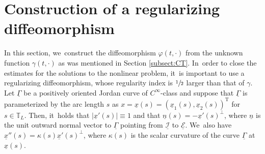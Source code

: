 \documentclass[10pt]{amsart}
\newcommand{\cI}{{\mathcal I}}
\newcommand{\cE}{{\mathcal E}}
\newcommand{\ul}[1]{\underline{#1}}
\newcommand{\itGamma}{\mathit{\Gamma}}
\theoremstyle{definition}
\begin{document}
\section{Construction of a regularizing diffeomorphism}\label{sect:diffeo}
In this section, we~construct the diffeomorphism $\varphi(t,\cdot)$ from the unknown function $\gamma(t,\cdot)$ as was mentioned in Section \ref{subsect:CT}. In~order to close the estimates for the solutions to the nonlinear problem, it~is important to use a regularizing diffeomorphism, whose regularity index is
$\sfrac12$ larger than that of $\gamma$.
Let $\ul{\itGamma}$ be a positively oriented Jordan curve of $C^\infty$-class and suppose that $\ul{\itGamma}$ is parameterized by the arc length $s$ as
$x = \ul{x}(s) = (\ul{x}_1(s),\ul{x}_2(s))^\mathrm{T}$ for $s \in \mathbb{T}_L$.
Then, it~holds that $|\ul{x}'(s)| \equiv 1$ and that $\ul{n}(s)=-\ul{x}'(s)^\perp$, where $\ul{n}$ is the unit outward normal vector to $\ul{\itGamma}$
pointing from $\ul{\cI}$ to $\ul{\cE}$. We~also have $\ul{x}''(s)=\kappa(s)\ul{x}'(s)^\perp$, where $\kappa(s)$ is the scalar curvature of the curve $\ul{\itGamma}$ at $\ul{x}(s)$.
\end{document}
